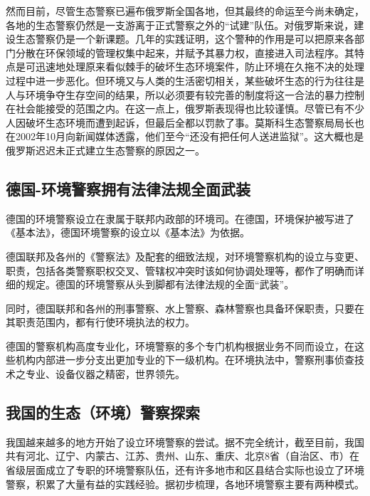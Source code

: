\documentclass[]{book}
\begin{document}
然而目前，尽管生态警察已遍布俄罗斯全国各地，但其最终的命运至今尚未确定，各地的生态警察仍然是一支游离于正式警察之外的``试建''队伍。对俄罗斯来说，建设生态警察仍是一个新课题。几年的实践证明，这个警种的作用是可以把原来各部门分散在环保领域的管理权集中起来，并赋予其暴力权，直接进入司法程序。其特点是可迅速地处理原来看似棘手的破坏生态环境案件，防止环境在久拖不决的处理过程中进一步恶化。但环境又与人类的生活密切相关，某些破坏生态的行为往往是人与环境争夺生存空间的结果，所以必须要有较完善的制度将这一合法的暴力控制在社会能接受的范围之内。在这一点上，俄罗斯表现得也比较谨慎。尽管已有不少人因破坏生态环境而遭到起诉，但最后全都以罚款了事。莫斯科生态警察局局长也在2002年10月向新闻媒体透露，他们至今``还没有把任何人送进监狱''。这大概也是俄罗斯迟迟未正式建立生态警察的原因之一。

\hypertarget{ux5fb7ux56fd-ux73afux5883ux8b66ux5bdfux62e5ux6709ux6cd5ux5f8bux6cd5ux89c4ux5168ux9762ux6b66ux88c5}{%
\subsection{德国-环境警察拥有法律法规全面武装}\label{ux5fb7ux56fd-ux73afux5883ux8b66ux5bdfux62e5ux6709ux6cd5ux5f8bux6cd5ux89c4ux5168ux9762ux6b66ux88c5}}

德国的环境警察设立在隶属于联邦内政部的环境司。在德国，环境保护被写进了《基本法》，德国环境警察的设立以《基本法》为依据。

德国联邦及各州的《警察法》及配套的细致法规，对环境警察机构的设立与变更、职责，包括各类警察职权交叉、管辖权冲突时该如何协调处理等，都作了明确而详细的规定。德国的环境警察从头到脚都有法律法规的全面``武装''。

同时，德国联邦和各州的刑事警察、水上警察、森林警察也具备环保职责，只要在其职责范围内，都有行使环境执法的权力。

德国的警察机构高度专业化，环境警察的多个专门机构根据业务不同而设立，在这些机构内部进一步分支出更加专业的下一级机构。在环境执法中，警察刑事侦查技术之专业、设备仪器之精密，世界领先。

\hypertarget{ux6211ux56fdux7684ux751fux6001ux73afux5883ux8b66ux5bdfux63a2ux7d22}{%
\subsection{我国的生态（环境）警察探索}\label{ux6211ux56fdux7684ux751fux6001ux73afux5883ux8b66ux5bdfux63a2ux7d22}}

我国越来越多的地方开始了设立环境警察的尝试。据不完全统计，截至目前，我国共有河北、辽宁、内蒙古、江苏、贵州、山东、重庆、北京8省（自治区、市）在省级层面成立了专职的环境警察队伍，还有许多地市和区县结合实际也设立了环境警察，积累了大量有益的实践经验。据初步梳理，各地环境警察主要有两种模式。
\end{document}
